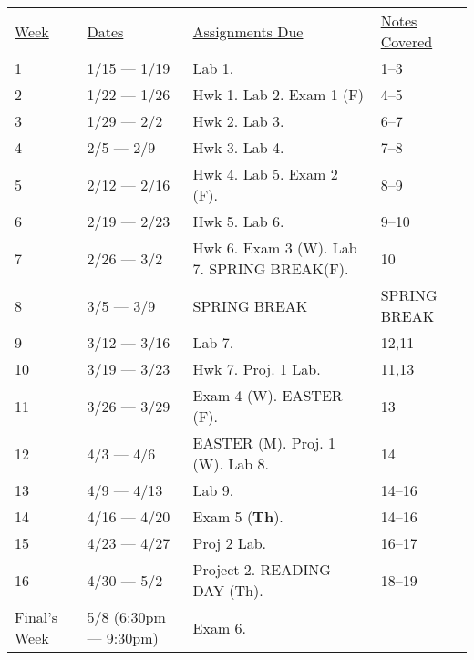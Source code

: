 \documentclass[10pt]{article}
\begin{document}
\begin{center}
\begin{tabular}{llll}
\underline{Week} & \underline{Dates} & \underline{Assignments Due} & \underline{Notes Covered}\\
1 & 1/15 --- 1/19 & Lab 1. & 1--3 \\
2 & 1/22 --- 1/26 & Hwk 1. Lab 2. Exam 1 (F) & 4--5 \\
3 & 1/29 --- 2/2 & Hwk 2. Lab 3.  & 6--7 \\
4 & 2/5 --- 2/9 & Hwk 3. Lab 4. & 7--8 \\
5 & 2/12 --- 2/16 & Hwk 4. Lab 5. Exam 2 (F). & 8--9 \\
6 & 2/19 --- 2/23 & Hwk 5. Lab 6. & 9--10 \\
7 & 2/26 --- 3/2 & Hwk 6.  Exam 3 (W). Lab 7. SPRING BREAK(F).  &  10 \\
8 & 3/5 --- 3/9 & SPRING BREAK & SPRING BREAK \\
9 & 3/12 --- 3/16 & Lab 7. & 12,11 \\
10 & 3/19 --- 3/23 & Hwk 7. Proj. 1 Lab. & 11,13\\
11 & 3/26 --- 3/29 &  Exam 4 (W). EASTER (F).  & 13 \\
12 & 4/3 --- 4/6 & EASTER (M).  Proj. 1 (W). Lab 8. & 14 \\
13 & 4/9 --- 4/13 &  Lab 9. & 14--16 \\
14 & 4/16 --- 4/20 & Exam 5 (\textbf{Th}). & 14--16 \\
15 & 4/23 --- 4/27 & Proj 2 Lab. & 16--17 \\
16 & 4/30 --- 5/2 & Project 2. READING DAY (Th). & 18--19  \\
Final's Week & 5/8 (6:30pm --- 9:30pm) & Exam 6. &  \\
\end{tabular}
\end{center}
\end{document}
